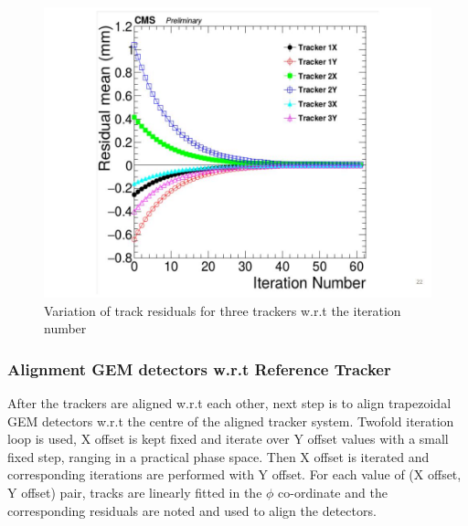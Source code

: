\begin{figure}[!htbp]
\centering
\includegraphics[width=5.1in]{figures/GEM/Tracker_iterative_alignment.jpg}
\caption{Variation of track residuals for three trackers  w.r.t the iteration number}\label{fig:resvsit}
\end{figure}

\subsubsection{Alignment GEM detectors w.r.t Reference Tracker}
After the trackers are aligned w.r.t each other, next step is to align trapezoidal GEM detectors w.r.t the centre of the aligned tracker system.
Twofold iteration loop is used, X offset is kept fixed and iterate over Y offset values with a small fixed step, ranging in a practical phase space. Then X offset is iterated and corresponding iterations are performed with Y offset. For each value of (X offset, Y offset) pair, tracks are linearly fitted in the $\phi$ co-ordinate and the corresponding residuals are noted and used to align the detectors.


